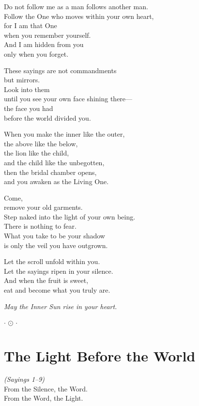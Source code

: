 \documentclass[10pt, openright]{book}
\newcommand{\ornament}{
    \vspace{1.5cm}
    \begin{center}
        \large $\cdot$ $\odot$ $\cdot$
    \end{center}
    \vspace{1.5cm}
}
\begin{document}
Do not follow me as a man follows another man. \\
Follow the One who moves within your own heart, \\
for I am that One \\
when you remember yourself. \\
And I am hidden from you \\
only when you forget.

These sayings are not commandments \\
but mirrors. \\
Look into them \\
until you see your own face shining there— \\
the face you had \\
before the world divided you.

When you make the inner like the outer, \\
the above like the below, \\
the lion like the child, \\
and the child like the unbegotten, \\
then the bridal chamber opens, \\
and you awaken as the Living One.

Come, \\
remove your old garments. \\
Step naked into the light of your own being. \\
There is nothing to fear. \\
What you take to be your shadow \\
is only the veil you have outgrown.

Let the scroll unfold within you. \\
Let the sayings ripen in your silence. \\
And when the fruit is sweet, \\
eat and become what you truly are.

\vspace{1cm}
\begin{center}
    \textit{May the Inner Sun rise in your heart.}
\end{center}
\ornament

\mainmatter

\chapter{The Light Before the World}
\begin{center}
    \textit{(Sayings 1--9)} \\
    \vspace{0.5cm}
    \small From the Silence, the Word. \\ From the Word, the Light.
\end{center}
\vspace{0.5cm}
\end{document}
